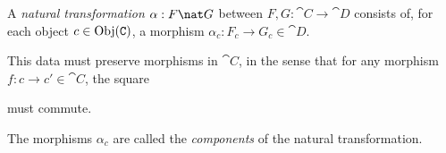 


\begin{dfn*}
	A \emph{natural transformation} $\alpha: F\nat G$ between
	 $F,G:\cat{C}\rightarrow\cat{D}$ consists of, for each
	object $c\in\text{Obj}({\normalfont\texttt{C}})$, a morphism $\alpha_c: F_c\rightarrow G_c\in \cat{D}$.

	This data must preserve morphisms in $\cat{C}$, in the sense that for
	any morphism $f: c\rightarrow c'\in\cat{C}$, the square

	\begin{figure}[H]
		\centering
	\end{figure}

	must commute.

	The morphisms $\alpha_c$ are called the \emph{components} of the natural
	transformation.
\end{dfn*}


